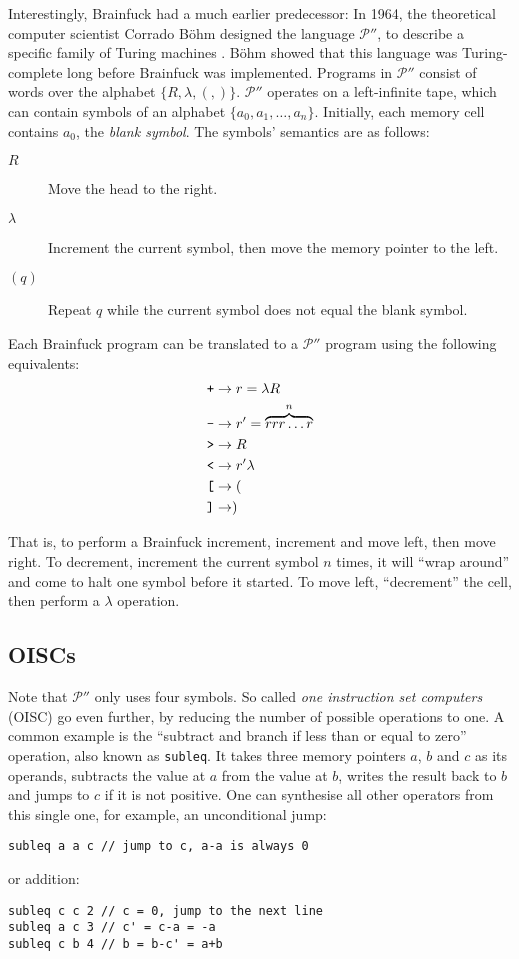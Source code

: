 Interestingly, Brainfuck had a much earlier predecessor: In 1964, the theoretical computer scientist Corrado Böhm designed the language $\mathcal{P}''$, to describe a specific family of Turing machines \cite{bohm1964family}. Böhm showed that this language was Turing-complete long before Brainfuck was implemented. Programs in $\mathcal{P}''$ consist of words over the alphabet $\{R, \lambda, (, )\}$. $\mathcal{P}''$ operates on a left-infinite tape, which can contain symbols of an alphabet $\{a_0, a_1, \dots, a_n\}$. Initially, each memory cell contains $a_0$, the \emph{blank symbol}. The symbols' semantics are as follows:

\begin{description}
    \item[\boldmath$R$] Move the head to the right.
    \item[\boldmath$\lambda$] Increment the current symbol, then move the memory pointer to the left.
    \item[\boldmath$(q)$] Repeat $q$ while the current symbol does not equal the blank symbol.
\end{description}

Each Brainfuck program can be translated  to a $\mathcal{P}''$ program using the following equivalents:
\begin{align*}
    \text{\texttt{+}} &\rightarrow r = \lambda R\\
    \text{\texttt{-}} &\rightarrow r' = \overbrace{rrr\dots r}^n\\
    \text{\texttt{>}} &\rightarrow R\\
    \text{\texttt{<}} &\rightarrow r'\lambda\\
    \text{\texttt{[}} &\rightarrow (\\
    \text{\texttt{]}} &\rightarrow )
\end{align*}

That is, to perform a Brainfuck increment, increment and move left, then move right. To decrement, increment the current symbol $n$ times, it will “wrap around” and come to halt one symbol before it started. To move left, “decrement” the cell, then perform a $\lambda$ operation.

\subsection{OISCs}

Note that $\mathcal{P}''$ only uses four symbols. So called \emph{one instruction set computers} (OISC) go even further, by reducing the number of possible operations to one. A common example is the “subtract and branch if less than or equal to zero” operation, also known as \texttt{subleq}. It takes three memory pointers $a$, $b$ and $c$ as its operands, subtracts the value at $a$ from the value at $b$, writes the result back to $b$ and jumps to $c$ if it is not positive. One can synthesise all other operators from this single one, for example, an unconditional jump:

\begin{lstlisting}
subleq a a c // jump to c, a-a is always 0
\end{lstlisting}

or addition:

\begin{lstlisting}
subleq c c 2 // c = 0, jump to the next line
subleq a c 3 // c' = c-a = -a
subleq c b 4 // b = b-c' = a+b
\end{lstlisting}
